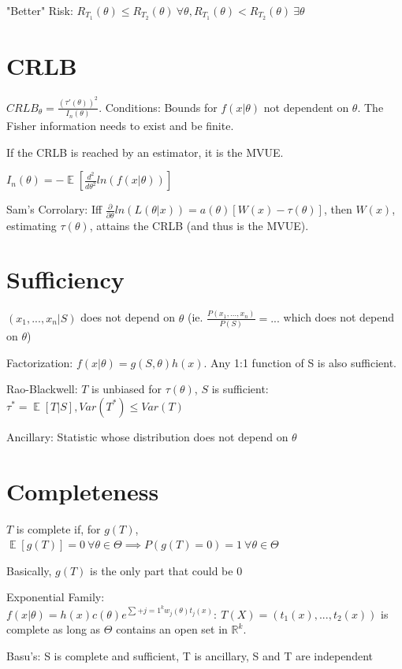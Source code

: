 \documentclass{article}
\DeclareMathOperator{\EX}{\mathbb{E}} %
\newcommand{\real}{\mathbb{R}} %
\let\Oldsum=\sum
\renewcommand{\sum}{\Oldsum\limits}
\begin{document}
"Better" Risk: $R_{T_1}(\theta) \le R_{T_2}(\theta) \ \forall \theta, R_{T_1}(\theta) < R_{T_2}(\theta) \ \exists \theta$

\section{CRLB}

$CRLB_{\theta} = \frac{(\tau'(\theta))^2}{I_n(\theta)}$. Conditions: Bounds for $f(x|\theta)$ not dependent on $\theta$. The Fisher information needs to exist and be finite.

If the CRLB is reached by an estimator, it is the MVUE.

$I_n(\theta) = -\EX[\frac{d^2}{d\theta^2}ln(f(x|\theta))]$

Sam's Corrolary: Iff $\frac{\partial}{\partial \theta} ln(L(\theta|x)) = a(\theta)[W(x) - \tau(\theta)]$, then $W(x)$, estimating $\tau(\theta)$, attains the CRLB (and thus is the MVUE).

\section{Sufficiency}

$(x_1, ..., x_n|S)$ does not depend on $\theta$ (ie. $\frac{P(x_1, ..., x_n)}{P(S)} = ...$ which does not depend on $\theta$)

Factorization: $f(x|\theta) = g(S, \theta)h(x)$. Any 1:1 function of S is also sufficient.

Rao-Blackwell: $T$ is unbiased for $\tau(\theta)$, $S$ is sufficient: $\tau^* = \EX[T|S], Var(T^*) \le Var(T)$

Ancillary: Statistic whose distribution does not depend on $\theta$

\section{Completeness}

$T$ is complete if, for $g(T)$, $\EX[g(T)] = 0 \ \forall \theta \in \Theta \implies P(g(T) = 0) = 1 \ \forall \theta \in \Theta$

Basically, $g(T)$ is the only part that could be 0

Exponential Family: $f(x|\theta) = h(x)c(\theta)e^{\sum+{j=1}^k w_j(\theta)t_j(x)}: \ T(X) = (t_1(x), ..., t_2(x))$ is complete as long as $\Theta$ contains an open set in $\real^k$.

Basu's: S is complete and sufficient, T is ancillary, S and T are independent
\end{document}
